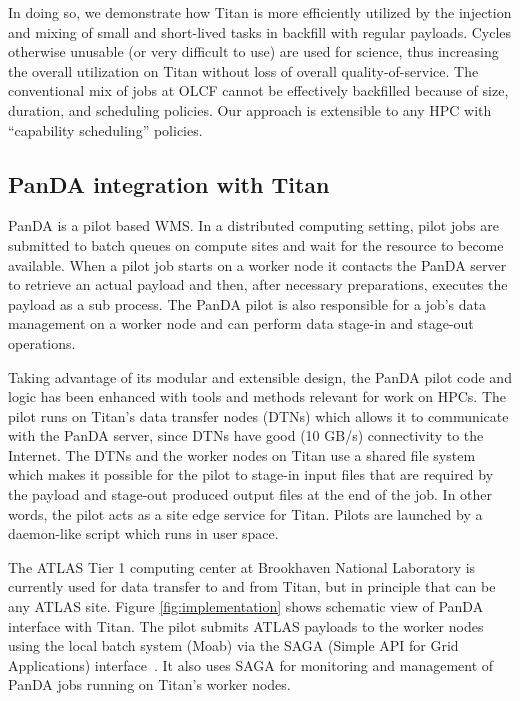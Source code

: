 
In doing so, we demonstrate how Titan is more efficiently utilized by the
injection and mixing of small and short-lived tasks in backfill with regular
payloads. Cycles otherwise unusable (or very difficult to use) are used for
science, thus increasing the overall utilization on Titan without loss of
overall quality-of-service. The conventional mix of jobs at OLCF cannot be
effectively backfilled because of size, duration, and scheduling policies. Our
approach is extensible to any HPC with ``capability scheduling'' policies.

\subsection{PanDA integration with Titan}
\label{subsec:integration}

PanDA is a pilot based WMS. In a distributed computing setting, pilot jobs are
submitted to batch queues on compute sites and wait for the resource to become
available. When a pilot job starts on a worker node it contacts the PanDA
server to retrieve an actual payload and then, after necessary preparations,
executes the payload as a sub process. The PanDA pilot is also responsible for
a job's data management on a worker node and can perform data stage-in and
stage-out operations. %

Taking advantage of its modular and extensible design, the PanDA pilot code and
logic has been enhanced with tools and methods relevant for work on HPCs. The
pilot runs on Titan's data transfer nodes (DTNs) which allows it to communicate
with the PanDA server, since DTNs have good (10 GB/s) connectivity to the
Internet. The DTNs and the worker nodes on Titan use a shared file system which
makes it possible for the pilot to stage-in input files that are required by
the payload and stage-out produced output files at the end of the job. In other
words, the pilot acts as a site edge service for Titan. Pilots are launched by
a daemon-like script which runs in user space. 

The ATLAS Tier 1 computing center at Brookhaven National Laboratory is
currently used for data transfer to and from Titan, but in principle that can
be any ATLAS site. Figure \ref{fig:implementation} shows schematic view of
PanDA interface with Titan. The pilot submits ATLAS payloads to the worker
nodes using the local batch system (Moab) via the SAGA (Simple API for Grid
Applications) interface~\cite{radical-saga_url}. It also uses SAGA for
monitoring and management of PanDA jobs running on Titan's worker nodes. 

